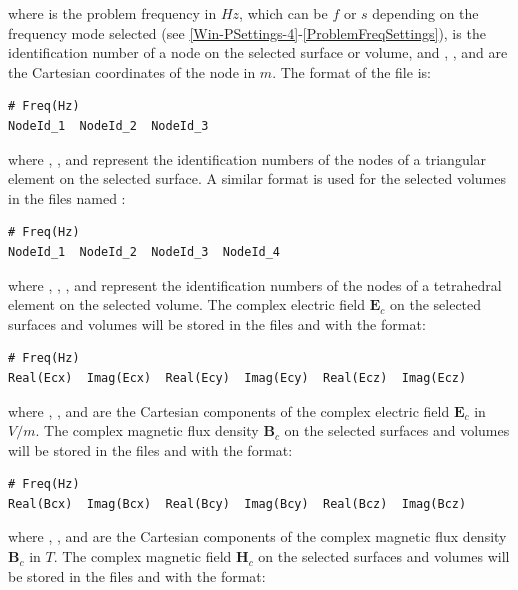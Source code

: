where  is the problem frequency in $Hz$, which can be $f$ or $s$ depending on the frequency mode selected (see \ref{Win-PSettings-4}-\ref{ProblemFreqSettings}),  is the identification number of a node on the selected surface or volume, and , , and  are the Cartesian coordinates of the node in $m$. The format of the file  is:
\begin{small}\begin{lstlisting}
# Freq(Hz)
NodeId_1  NodeId_2  NodeId_3
\end{lstlisting}\end{small} 
where , , and  represent the identification numbers of the nodes of a triangular element on the selected surface. A similar format is used for the selected volumes in the files named :
\begin{small}\begin{lstlisting}
# Freq(Hz)
NodeId_1  NodeId_2  NodeId_3  NodeId_4
\end{lstlisting}\end{small} 
where , , , and  represent the identification numbers of the nodes of a tetrahedral element on the selected volume. The complex electric field $\mathbf{E}_{c}$ on the selected surfaces and volumes will be stored in the files  and  with the format:
\begin{small}\begin{lstlisting}
# Freq(Hz)
Real(Ecx)  Imag(Ecx)  Real(Ecy)  Imag(Ecy)  Real(Ecz)  Imag(Ecz)
\end{lstlisting}\end{small} 
where , , and  are the Cartesian components of the complex electric field $\mathbf{E}_{c}$ in $V/m$. The complex magnetic flux density $\mathbf{B}_{c}$ on the selected surfaces and volumes will be stored in the files  and  with the format:
\begin{small}\begin{lstlisting}
# Freq(Hz)
Real(Bcx)  Imag(Bcx)  Real(Bcy)  Imag(Bcy)  Real(Bcz)  Imag(Bcz)
\end{lstlisting}\end{small} 
where , , and  are the Cartesian components of the complex magnetic flux density $\mathbf{B}_{c}$ in $T$. The complex magnetic field $\mathbf{H}_{c}$ on the selected surfaces and volumes will be stored in the files  and  with the format:
